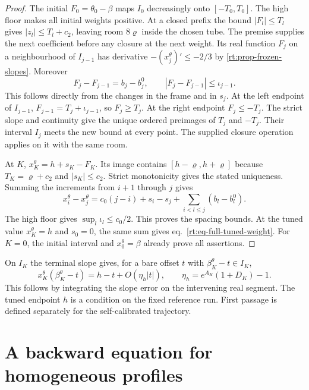 \documentclass[11pt,letterpaper,reqno]{amsart}
\numberwithin{equation}{section}
\renewcommand{\eqref}[1]{\textup{eq.~\ref{#1}}}
\theoremstyle{definition}
\theoremstyle{remark}
\begin{document}
\begin{proof}
The initial $F_0=\theta_0-\beta$ maps $I_0$ decreasingly onto
$[-T_0,T_0]$. The high floor makes all initial weights positive.
At a closed prefix the bound $|F_l|\le T_l$ gives
$|z_l|\le T_l+c_2$, leaving room $8\varrho$ inside the chosen tube.
The premise supplies the next coefficient before any closure at
the next weight. Its real function $F_j$ on a neighbourhood of
$I_{j-1}$ has derivative $-(x_j^\theta)'\le-2/3$ by
\cref{rt:prop-frozen-slopes}. Moreover
\begin{equation}\label{rt:eq-frozen-F-difference}
     F_j-F_{j-1}=b_j-b_j^0,
     \qquad |F_j-F_{j-1}|\le\iota_{j-1}.
\end{equation}
This follows directly from the changes in the frame and in $s_j$.
At the left endpoint of $I_{j-1}$, $F_{j-1}=T_j+\iota_{j-1}$,
so $F_j\ge T_j$. At the right endpoint $F_j\le-T_j$. The strict
slope and continuity give the unique ordered preimages of $T_j$
and $-T_j$. Their interval $I_j$ meets the new bound at every point.
The supplied closure operation applies on it with the same room.

At $K$, $x_K^\theta=h+s_K-F_K$. Its image contains
$[h-\varrho,h+\varrho]$ because $T_K=\varrho+c_2$ and
$|s_K|\le c_2$. Strict monotonicity gives the stated uniqueness.
Summing the increments from $i+1$ through $j$ gives
\[
  x_i^\theta-x_j^\theta=c_0(j-i)+s_i-s_j
                                  +\sum_{i<l\le j}(b_l-b_l^0).
\]
The high floor gives $\sup_l\iota_l\le c_0/2$. This proves the
spacing bounds. At the tuned value $x_K^\theta=h$ and $s_0=0$,
the same sum gives \eqref{rt:eq-full-tuned-weight}. For $K=0$,
the initial interval and $x_0^\theta=\beta$ already prove all
assertions.
\end{proof}

On $I_K$ the terminal slope gives, for a bare offset $t$ with
$\beta_K^\theta-t\in I_K$,
\[
       x_K^\theta(\beta_K^\theta-t)=h-t+O(\eta_h|t|),
       \qquad \eta_h=e^{A_K}(1+D_K)-1.
\]
This follows by integrating the slope error on the intervening
real segment. The tuned endpoint $h$ is a condition on the fixed
reference run. First passage is defined separately for the
self-calibrated trajectory.

\section{A backward equation for homogeneous profiles}
\label{rt:sec-homogeneous-tuning}
\end{document}
